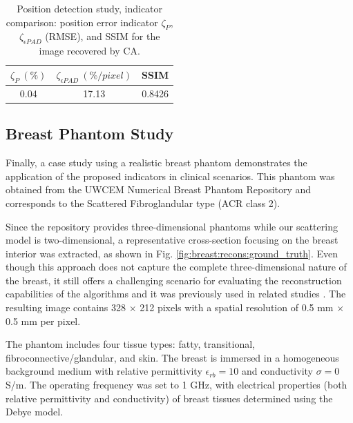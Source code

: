 \documentclass{ieeeaccess}
\begin{document}
            \begin{table}[!htb]
                \centering
                \renewcommand{\arraystretch}{1.5}
                \caption{Position detection study, indicator comparison: position error indicator $\zeta_P$, $\zeta_{\epsilon PAD}$ (RMSE), and SSIM for the image recovered by CA.}
                \label{tab:position:indicatorcomparison}
                \begin{tabular}{ccc}
                    $\zeta_P~(\%)$  & $\zeta_{\epsilon PAD}~(\%/pixel)$ & SSIM \\\hline
                    0.04 & 17.13 & 0.8426 \\
                \end{tabular}   
            \end{table}

    \subsection{Breast Phantom Study}\label{sec:results:breast}

        Finally, a case study using a realistic breast phantom demonstrates the application of the proposed indicators in clinical scenarios. This phantom was obtained from the UWCEM Numerical Breast Phantom Repository \cite{burfeindt2012mri} and corresponds to the Scattered Fibroglandular type (ACR class 2). 

        Since the repository provides three-dimensional phantoms while our scattering model is two-dimensional, a representative cross-section focusing on the breast interior was extracted, as shown in Fig. \ref{fig:breast:recons:ground_truth}. Even though this approach does not capture the complete three-dimensional nature of the breast, it still offers a challenging scenario for evaluating the reconstruction capabilities of the algorithms and it was previously used in related studies \cite{contzano2023fast,wu2024physics,shah2018fast,batista2025eispy2d}. The resulting image contains 328 $\times$ 212 pixels with a spatial resolution of 0.5 mm $\times$ 0.5 mm per pixel. 

        The phantom includes four tissue types: fatty, transitional, fibroconnective/glandular, and skin. The breast is immersed in a homogeneous background medium with relative permittivity $\epsilon_{rb} = 10$ and conductivity $\sigma = 0$ S/m. The operating frequency was set to 1 GHz, with electrical properties (both relative permittivity and conductivity) of breast tissues determined using the Debye model.
\end{document}
